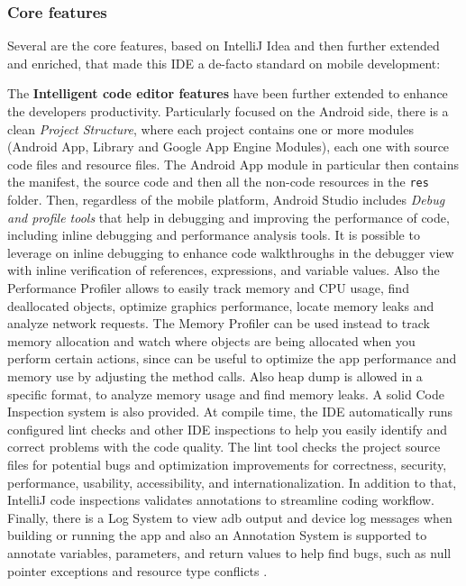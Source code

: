 \newpage
\subsubsection{Core features}
Several are the core features, based on IntelliJ Idea and then further extended and enriched, that made this IDE a de-facto standard on mobile development:

\noindent The \textbf{Intelligent code editor features} have been further extended to enhance the developers productivity. Particularly focused on the Android side, there is a clean \textit{Project Structure}, where each project contains one or more modules (Android App, Library and Google App Engine Modules), each one with source code files and resource files. The Android App module in particular then contains the manifest, the source code and then all the non-code resources in the \texttt{res} folder. Then, regardless of the mobile platform, Android Studio includes \textit{Debug and profile tools} that help in debugging and improving the performance of code, including inline debugging and performance analysis tools. It is possible to leverage on inline debugging to enhance code walkthroughs in the debugger view with inline verification of references, expressions, and variable values. Also the Performance Profiler allows to easily track memory and CPU usage, find deallocated objects, optimize graphics performance, locate memory leaks and analyze network requests. The Memory Profiler can be used instead to track memory allocation and watch where objects are being allocated when you perform certain actions, since can be useful to optimize the app performance and memory use by adjusting the method calls. Also heap dump is allowed in a specific format, to analyze memory usage and find memory leaks. A solid Code Inspection system is also provided. At compile time, the IDE automatically runs configured lint checks and other IDE inspections to help you easily identify and correct problems with the code quality. The lint tool checks the project source files for potential bugs and optimization improvements for correctness, security, performance, usability, accessibility, and internationalization. In addition to that, IntelliJ code inspections validates annotations to streamline coding workflow. Finally, there is a Log System to view adb output and device log messages when building or running the app and also an Annotation System is supported to annotate variables, parameters, and return values to help find bugs, such as null pointer exceptions and resource type conflicts \cite{AndroidStudioCodeEditorFeature}.

